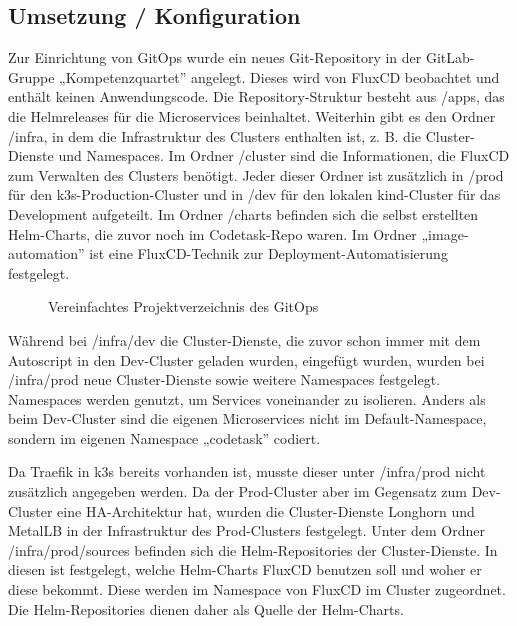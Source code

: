 \subsection{Umsetzung / Konfiguration}
Zur Einrichtung von GitOps wurde ein neues Git-Repository in der GitLab-Gruppe „Kompetenzquartet” angelegt. Dieses wird von FluxCD beobachtet und enthält keinen Anwendungscode.
Die Repository-Struktur besteht aus /apps, das die Helmreleases für die Microservices beinhaltet. Weiterhin gibt es den Ordner /infra, in dem die Infrastruktur des Clusters enthalten ist, z. B. die Cluster-Dienste und Namespaces.
Im Ordner /cluster sind die Informationen, die FluxCD zum Verwalten des Clusters benötigt.
Jeder dieser Ordner ist zusätzlich in /prod für den k3s-Production-Cluster und in /dev für den lokalen kind-Cluster für das Development aufgeteilt.
Im Ordner /charts befinden sich die selbst erstellten Helm-Charts, die zuvor noch im Codetask-Repo waren. Im Ordner „image-automation” ist eine FluxCD-Technik zur Deployment-Automatisierung festgelegt.
\begin{figure}[htbp]


\caption{Vereinfachtes Projektverzeichnis des GitOps}
\label{fig:gitopsstruktur}

\end{figure}

Während bei /infra/dev die Cluster-Dienste, die zuvor schon immer mit dem Autoscript in den Dev-Cluster geladen wurden, eingefügt wurden, wurden bei /infra/prod neue Cluster-Dienste sowie weitere Namespaces festgelegt. Namespaces werden genutzt, um Services voneinander zu isolieren.
Anders als beim Dev-Cluster sind die eigenen Microservices nicht im Default-Namespace, sondern im eigenen Namespace „codetask” codiert.

Da Traefik in k3s bereits vorhanden ist, musste dieser unter /infra/prod nicht zusätzlich angegeben werden. 
Da der Prod-Cluster aber im Gegensatz zum Dev-Cluster eine HA-Architektur hat, wurden die Cluster-Dienste Longhorn und MetalLB in der Infrastruktur des Prod-Clusters festgelegt.
Unter dem Ordner /infra/prod/sources befinden sich die Helm-Repositories der Cluster-Dienste. In diesen ist festgelegt, welche Helm-Charts FluxCD benutzen soll und woher er diese bekommt. 
Diese werden im Namespace von FluxCD im Cluster zugeordnet.
Die Helm-Repositories dienen daher als Quelle der Helm-Charts.

